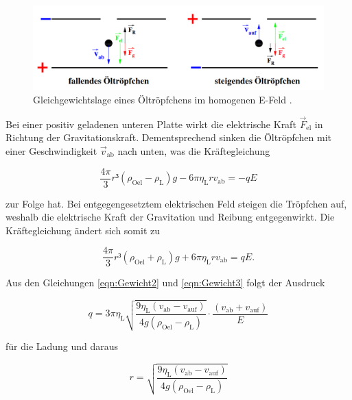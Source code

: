 \begin{figure}
    \centering
    \includegraphics[width=\textwidth]{content/GewichtV.png}
    \caption{Gleichgewichtslage eines Öltröpfchens im homogenen E-Feld \cite{Versuchsanleitung_v503}.}
    \label{fig:GewichtV}
\end{figure}

\noindent Bei einer positiv geladenen unteren Platte wirkt die elektrische Kraft $\vec{F}_\text{el}$
in Richtung der Gravitationskraft. Dementsprechend sinken die Öltröpfchen mit einer Geschwindigkeit $\vec{v}_\text{ab}$
nach unten, was die Kräftegleichung 

\begin{equation}
\label{eqn:Gewicht2}
    \frac{4\pi}{3}r³\left(\rho_\text{Oel}-\rho_\text{L}\right)g - 6\pi{}\eta_\text{L}rv_\text{ab} = -qE
\end{equation}

\noindent zur Folge hat. Bei entgegengesetztem elektrischen Feld steigen die Tröpfchen auf, weshalb die
elektrische Kraft der Gravitation und Reibung entgegenwirkt. Die Kräftegleichung ändert sich somit zu 

\begin{equation}
\label{eqn:Gewicht3}
\frac{4\pi}{3}r³\left(\rho_\text{Oel}+\rho_\text{L}\right)g + 6\pi{}\eta_\text{L}rv_\text{ab} = qE.
\end{equation}

\noindent Aus den Gleichungen \eqref{eqn:Gewicht2} und \eqref{eqn:Gewicht3} folgt der Ausdruck

\begin{equation}
\label{eqn:Ladung}
    q = 3\pi{}\eta_\text{L}\sqrt{\frac{9\eta_\text{L}\left(v_\text{ab}-v_\text{auf}\right)}{4g\left(\rho_\text{Oel}-\rho_\text{L}\right)}}\cdot\frac{\left(v_\text{ab}+v_\text{auf}\right)}{E}
\end{equation}

\noindent für die Ladung und daraus

\begin{equation}
\label{eqn:Radius}
    r = \sqrt{\frac{9\eta_\text{L}\left(v_\text{ab}-v_\text{auf}\right)}{4g\left(\rho_\text{Oel}-\rho_\text{L}\right)}}
\end{equation}

